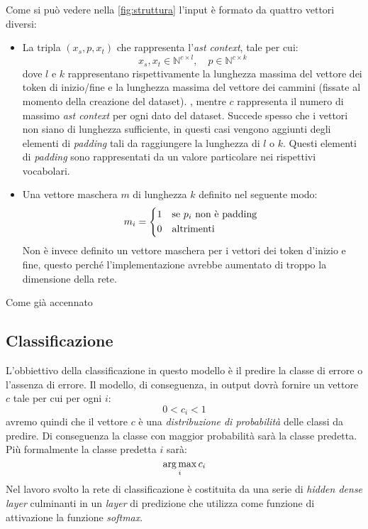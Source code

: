 Come si può vedere nella \autoref{fig:struttura} l'input è formato da quattro vettori diversi:
    \begin{itemize}
        \item La tripla $(x_s, p, x_t)$ che rappresenta l'\textit{ast context}, tale per cui:
            \[x_s, x_t \in \mathbb{N}^{c \times l}, \quad p \in \mathbb{N}^{c \times k}\]
        dove $l$ e $k$ rappresentano rispettivamente la lunghezza massima del vettore dei token di inizio/fine e la lunghezza massima del vettore dei cammini (fissate al momento della creazione del dataset).
        , mentre $c$ rappresenta il numero di massimo \textit{ast context} per ogni dato del dataset.
        Succede spesso che i vettori non siano di lunghezza sufficiente, in questi casi vengono aggiunti degli elementi di \textit{padding}
        tali da raggiungere la lunghezza di $l$ o $k$. Questi elementi di \textit{padding} sono rappresentati da un valore particolare nei rispettivi vocabolari.
        \item Una vettore maschera $m$ di lunghezza $k$ definito nel seguente modo:
        \begin{align*}
                m_i =
                \begin{cases*}
                  1 & se $p_i$ non è padding \\
                  0 & altrimenti
                \end{cases*}
        \end{align*}
        Non è invece definito un vettore maschera per i vettori dei token d'inizio e fine, questo perché l'implementazione avrebbe aumentato di troppo la dimensione della rete.
    \end{itemize}
Come già accennato 
\subsection{Classificazione}
L'obbiettivo della classificazione in questo modello è il predire la classe di errore o l'assenza di errore. 
Il modello, di conseguenza, in output dovrà fornire un vettore $c$ tale per cui per ogni $i$:
\[0 < c_i < 1\]
avremo quindi che il vettore $c$ è una \textit{distribuzione di probabilità} delle classi da predire.
Di conseguenza la classe con maggior probabilità sarà la classe predetta. Più formalmente la classe predetta $i$ sarà:
    \[\operatorname*{arg\,max}_i c_i\]
Nel lavoro svolto la rete di classificazione è costituita da una serie di \textit{hidden dense layer} culminanti in un \textit{layer} di predizione che utilizza come funzione di attivazione la funzione \textit{softmax}.




